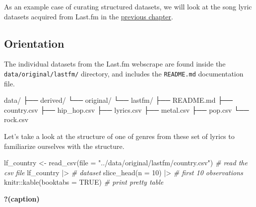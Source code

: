 \documentclass[
  letterpaper,
  DIV=11,
  numbers=noendperiod]{scrreport}
\newenvironment{Shaded}{\begin{snugshade}}{\end{snugshade}}
\newcommand{\AttributeTok}[1]{\textcolor[rgb]{0.00,0.00,0.00}{#1}}
\newcommand{\CommentTok}[1]{\textcolor[rgb]{0.00,0.00,0.00}{\textit{#1}}}
\newcommand{\ConstantTok}[1]{\textcolor[rgb]{0.00,0.00,0.00}{#1}}
\newcommand{\DecValTok}[1]{\textcolor[rgb]{0.00,0.00,0.00}{#1}}
\newcommand{\ExtensionTok}[1]{\textcolor[rgb]{0.00,0.00,0.00}{#1}}
\newcommand{\FunctionTok}[1]{\textcolor[rgb]{0.00,0.00,0.00}{#1}}
\newcommand{\NormalTok}[1]{\textcolor[rgb]{0.00,0.00,0.00}{#1}}
\newcommand{\OtherTok}[1]{\textcolor[rgb]{0.00,0.00,0.00}{#1}}
\newcommand{\SpecialCharTok}[1]{\textcolor[rgb]{0.00,0.00,0.00}{#1}}
\newcommand{\StringTok}[1]{\textcolor[rgb]{0.00,0.00,0.00}{#1}}
\theoremstyle{definition}
\theoremstyle{remark}
\begin{document}
As an example case of curating structured datasets, we will look at the
song lyric datasets acquired from Last.fm in the
\protect\hyperlink{sec-acquire-data}{previous chapter}.

\hypertarget{orientation-1}{%
\subsection{Orientation}\label{orientation-1}}

The individual datasets from the Last.fm webscrape are found inside the
\texttt{data/original/lastfm/} directory, and includes the
\texttt{README.md} documentation file.

\begin{Shaded}
\begin{Highlighting}[]
\ExtensionTok{data/}
\ExtensionTok{├──}\NormalTok{ derived/}
\ExtensionTok{└──}\NormalTok{ original/}
    \ExtensionTok{└──}\NormalTok{ lastfm/}
        \ExtensionTok{├──}\NormalTok{ README.md}
        \ExtensionTok{├──}\NormalTok{ country.csv}
        \ExtensionTok{├──}\NormalTok{ hip\_hop.csv}
        \ExtensionTok{├──}\NormalTok{ lyrics.csv}
        \ExtensionTok{├──}\NormalTok{ metal.csv}
        \ExtensionTok{├──}\NormalTok{ pop.csv}
        \ExtensionTok{└──}\NormalTok{ rock.csv}
\end{Highlighting}
\end{Shaded}

Let's take a look at the structure of one of genres from these set of
lyrics to familiarize ourselves with the structure.

\begin{Shaded}
\begin{Highlighting}[]
\NormalTok{lf\_country }\OtherTok{\textless{}{-}} \FunctionTok{read\_csv}\NormalTok{(}\AttributeTok{file =} \StringTok{"../data/original/lastfm/country.csv"}\NormalTok{) }\CommentTok{\# read the csv file}
\NormalTok{lf\_country }\SpecialCharTok{|\textgreater{}} \CommentTok{\# dataset}
  \FunctionTok{slice\_head}\NormalTok{(}\AttributeTok{n =} \DecValTok{10}\NormalTok{) }\SpecialCharTok{|\textgreater{}} \CommentTok{\# first 10 observations }
\NormalTok{knitr}\SpecialCharTok{::}\FunctionTok{kable}\NormalTok{(}\AttributeTok{booktabs =} \ConstantTok{TRUE}\NormalTok{) }\CommentTok{\# print pretty table}
\end{Highlighting}
\end{Shaded}

\begin{table}

\caption{\textbf{?(caption)}}

\end{table}
\end{document}

